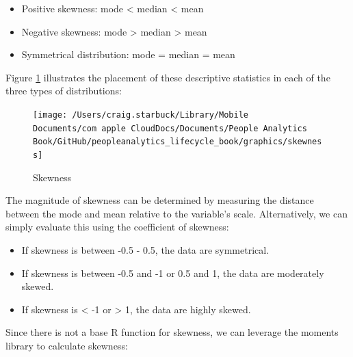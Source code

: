 \documentclass[]{book}
\newenvironment{Shaded}{\begin{snugshade}}{\end{snugshade}}
\newcommand{\CommentTok}[1]{\textcolor[rgb]{0.56,0.35,0.01}{\textit{#1}}}
\newcommand{\DecValTok}[1]{\textcolor[rgb]{0.00,0.00,0.81}{#1}}
\newcommand{\KeywordTok}[1]{\textcolor[rgb]{0.13,0.29,0.53}{\textbf{#1}}}
\newcommand{\NormalTok}[1]{#1}
\newcommand{\OperatorTok}[1]{\textcolor[rgb]{0.81,0.36,0.00}{\textbf{#1}}}
\providecommand{\tightlist}{%
  \setlength{\itemsep}{0pt}\setlength{\parskip}{0pt}}
\begin{document}
\begin{itemize}
\tightlist
\item
  Positive skewness: mode \textless{} median \textless{} mean
\item
  Negative skewness: mode \textgreater{} median \textgreater{} mean
\item
  Symmetrical distribution: mode = median = mean
\end{itemize}

Figure \ref{fig:skewness} illustrates the placement of these descriptive statistics in each of the three types of distributions:

\begin{figure}

{\centering \texttt{[image: /Users/craig.starbuck/Library/Mobile Documents/com~apple~CloudDocs/Documents/People Analytics Book/GitHub/peopleanalytics\_lifecycle\_book/graphics/skewness]} 

}

\caption{Skewness}\label{fig:skewness}
\end{figure}

The magnitude of skewness can be determined by measuring the distance between the mode and mean relative to the variable's scale. Alternatively, we can simply evaluate this using the coefficient of skewness:

\begin{itemize}
\tightlist
\item
  If skewness is between -0.5 - 0.5, the data are symmetrical.
\item
  If skewness is between -0.5 and -1 or 0.5 and 1, the data are moderately skewed.
\item
  If skewness is \textless{} -1 or \textgreater{} 1, the data are highly skewed.
\end{itemize}

Since there is not a base R function for skewness, we can leverage the moments library to calculate skewness:

\begin{Shaded}
\end{Shaded}
\end{document}
